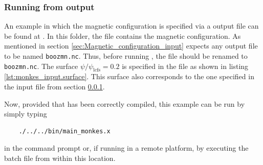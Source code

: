 	
\subsubsection{Running from {\BOOZERXFORM} output}\label{sec:Running_example_boozer_xform_input}
An example in which the magnetic configuration is specified via a {\BOOZERXFORM} output file can be found at \texttt{}. In this folder, the file \texttt{} contains the magnetic configuration. As mentioned in section \ref{sec:Magnetic_configuration_input} {\MONKES} expects any {\BOOZERXFORM} output file to be named \texttt{boozmn.nc}. Thus, before running {\MONKES}, the file \texttt{} should be renamed to \texttt{boozmn.nc}. The surface $\psi/\psi_{\text{lcfs}}=0.2$ is specified in the \texttt{} file as shown in listing \ref{lst:monkes_input.surface}. This surface also corresponds to the one specified in the {\DKES} input file from section \ref{sec:Running_example_boozer_xform_input}.



Now, provided that {\MONKES} has been correctly compiled, this example can be run by simply typing
\begin{verbatim}
	./../../bin/main_monkes.x
\end{verbatim}
in the command prompt or, if running in a remote platform, by executing the batch file from within this location.

